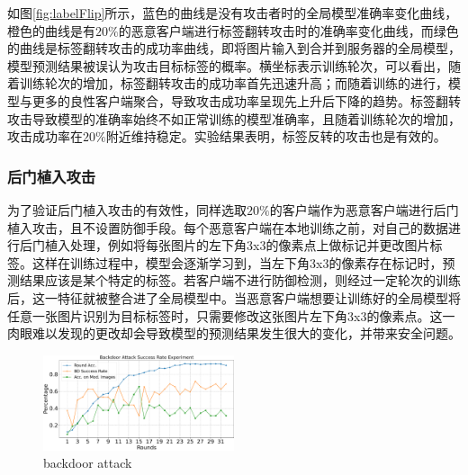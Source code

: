 \documentclass[conference]{IEEEtran}
\def\figBackdoorAttack{0.5\textwidth}
\begin{document}
如图\hyperref[fig:labelFlip]{\ref{fig:labelFlip}}所示，蓝色的曲线是没有攻击者时的全局模型准确率变化曲线，橙色的曲线是有$20\%$的恶意客户端进行标签翻转攻击时的准确率变化曲线，而绿色的曲线是标签翻转攻击的成功率曲线，即将图片输入到合并到服务器的全局模型，模型预测结果被误认为攻击目标标签的概率。横坐标表示训练轮次，可以看出，随着训练轮次的增加，标签翻转攻击的成功率首先迅速升高；而随着训练的进行，模型与更多的良性客户端聚合，导致攻击成功率呈现先上升后下降的趋势。标签翻转攻击导致模型的准确率始终不如正常训练的模型准确率，且随着训练轮次的增加，攻击成功率在$20\%$附近维持稳定。实验结果表明，标签反转的攻击也是有效的。

\subsubsection{\textbf{后门植入攻击}}
\label{exp:attack:backdoor}

为了验证后门植入攻击的有效性，同样选取$20\%$的客户端作为恶意客户端进行后门植入攻击，且不设置防御手段。每个恶意客户端在本地训练之前，对自己的数据进行后门植入处理，例如将每张图片的左下角3x3的像素点上做标记并更改图片标签。这样在训练过程中，模型会逐渐学习到，当左下角3x3的像素存在标记时，预测结果应该是某个特定的标签。若客户端不进行防御检测，则经过一定轮次的训练后，这一特征就被整合进了全局模型中。当恶意客户端想要让训练好的全局模型将任意一张图片识别为目标标签时，只需要修改这张图片左下角3x3的像素点。这一肉眼难以发现的更改却会导致模型的预测结果发生很大的变化，并带来安全问题。

\begin{figure}[htbp]
    \centerline{\includegraphics[width=\figBackdoorAttack]{pics/003-backdoorAttack.pdf}}
    \caption{backdoor attack}
    \label{fig:backdoorAttack}
\end{figure}
\end{document}
